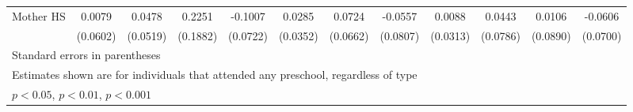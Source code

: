 \begin{table}[htbp]
\begin{tabular}{l*{11}{c}}
\addlinespace
Mother HS   &      0.0079         &      0.0478         &      0.2251         &     -0.1007         &      0.0285         &      0.0724         &     -0.0557         &      0.0088         &      0.0443         &      0.0106         &     -0.0606         \\
            &    (0.0602)         &    (0.0519)         &    (0.1882)         &    (0.0722)         &    (0.0352)         &    (0.0662)         &    (0.0807)         &    (0.0313)         &    (0.0786)         &    (0.0890)         &    (0.0700)         \\
\bottomrule
\multicolumn{12}{l}{\footnotesize Standard errors in parentheses}\\
\multicolumn{12}{l}{\footnotesize Estimates shown are for individuals that attended any preschool, regardless of type}\\
\multicolumn{12}{l}{\footnotesize \sym{*} \(p<0.05\), \sym{**} \(p<0.01\), \sym{***} \(p<0.001\)}\\
\end{tabular}
\end{table}
